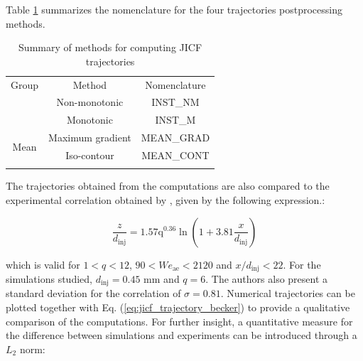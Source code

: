 \clearpage

Table \ref{tab:jicf_tools_trajectories_obtention} summarizes the nomenclature for the four trajectories postprocessing methods.

\begin{table}[!h]
\centering
\caption{Summary of methods for computing JICF trajectories}
\begin{tabular}{ccc}
\thickhline
Group & Method & Nomenclature \\
\thickhline
\multirow{2}{*}{Instantaneous} & Non-monotonic & INST\_NM \\
 & Monotonic & INST\_M \\
 \hline
\multirow{2}{*}{Mean} & Maximum gradient & MEAN\_GRAD \\
 & Iso-contour & MEAN\_CONT \\
\thickhline
\end{tabular}
\label{tab:jicf_tools_trajectories_obtention}
\end{table}




The trajectories obtained from the computations are also compared to the experimental correlation obtained by , given by the following expression.:

\begin{equation}
    \label{eq:jicf_trajectory_becker}
    \frac{z}{d_\mathrm{inj}} = 1.57 \mathrm{q}^{0.36} \ln \left( 1 + 3.81 \frac{x}{d_\mathrm{inj}} \right)
\end{equation}

which is valid for $1 < q < 12$, $90 < We_\mathrm{ae} < 2120$ and $x/d_\mathrm{inj} < 22$. For the simulations studied, $d_\mathrm{inj} = 0.45$ mm and $q = 6$. The authors also present a standard deviation for the correlation of $\sigma = 0.81$. Numerical trajectories can be plotted together with Eq. (\ref{eq:jicf_trajectory_becker}) to provide a qualitative comparison of the computations. For further insight, a quantitative measure for the difference between simulations and experiments can be introduced through a $L_2$ norm:

